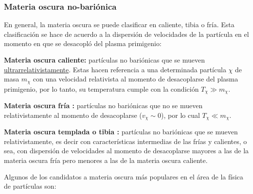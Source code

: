 \subsubsection{Materia oscura no-bariónica} 
En general, la materia oscura se puede clasificar en caliente, tibia o fría. Esta clasificación se hace de acuerdo a la dispersión de velocidades de la partícula en el
momento en que se desacopló del plasma primigenio:
\begin{itemize_f}
\item[-] \textbf{Materia oscura caliente: } partículas no bariónicas que se mueven \href{https://en.wikipedia.org/wiki/Ultrarelativistic_limit}{ultrarrelativistamente}. Estas hacen referencia a una determinada partícula $\chi$ de masa $m_\chi$ con una velocidad relativista al momento de desacoplarse del plasma primigenio, por lo tanto, su temperatura cumple con la condición $T_\chi \gg m_\chi$. 

\item[-] \textbf{Materia oscura fría :} partículas no bariónicas que no se mueven relativistamente al momento de desacoplarse ($v_\chi \sim 0$), por lo cual $T_\chi \ll m_\chi$. 

\item[-] \textbf{Materia oscura templada o tibia :} partículas no bariónicas que se mueven relativistamente, es decir con
características intermedias de las frías y calientes, o sea, con dispersión de velocidades al momento de desacoplarse mayores a las de la materia oscura fría pero menores a las de la materia oscura caliente.
\end{itemize_f}

Algunos de los candidatos a materia oscura más populares en el área de la física de partículas son: 

